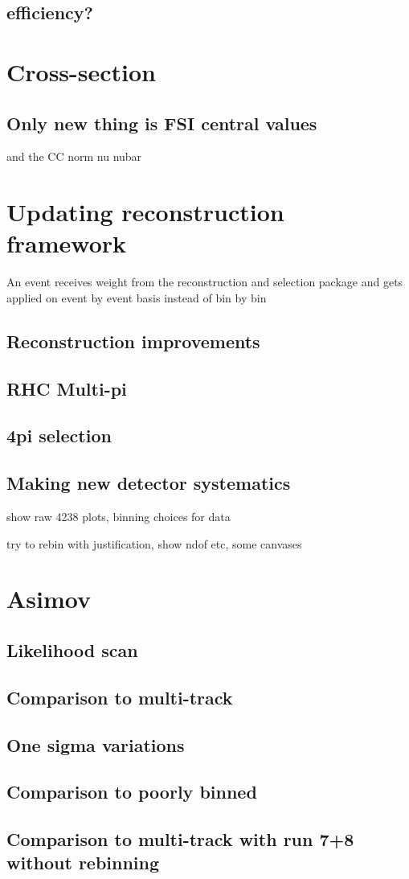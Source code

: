 \subsection{efficiency?}

\section{Cross-section}
\subsection{Only new thing is FSI central values}
and the CC norm nu nubar
\section{Updating reconstruction framework}
An event receives weight from the reconstruction and selection package and gets applied on event by event basis instead of bin by bin
\subsection{Reconstruction improvements}
\subsection{RHC Multi-pi}
\subsection{4pi selection}

\subsection{Making new detector systematics}

show raw 4238 plots, binning choices for data

try to rebin with justification, show ndof etc, some canvases



\section{Asimov}
\subsection{Likelihood scan}
\subsection{Comparison to multi-track}
\subsection{One sigma variations}
\subsection{Comparison to poorly binned}

\subsection{Comparison to multi-track with run 7+8 without rebinning}
